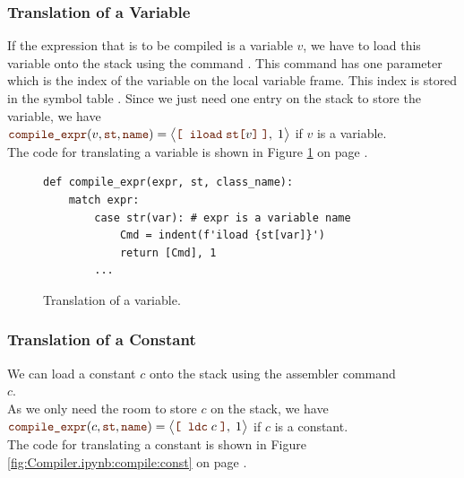 \subsubsection{Translation of a Variable}
If the expression that is to be compiled is a variable $v$, we have to load this variable onto the stack using
the command .  This command has one parameter which is the index of the variable on the local
variable frame.  This index is stored in the symbol table .  Since we just need one entry on the
stack to store the variable, we have
\\[0.2cm]
\hspace*{1.3cm}
$\mytt{compile\_expr}(v, \mytt{st}, \mytt{name}) = 
 \bigl\langle\mytt{[}\;\; \mytt{iload}\; \mytt{st[}v\mytt{]}\; \mytt{]}, \; 1\bigr\rangle$ \quad
 if $v$ is a variable.
\\[0.2cm]
The code for translating a variable is shown in Figure \ref{fig:Compiler.ipynb:compile:var} on page
\pageref{fig:Compiler.ipynb:compile:var}.

\begin{figure}[!ht]
\centering
\begin{verbatim}
def compile_expr(expr, st, class_name):
    match expr:
        case str(var): # expr is a variable name
            Cmd = indent(f'iload {st[var]}')
            return [Cmd], 1
        ...
\end{verbatim}
\vspace*{-0.3cm}
\caption{Translation of a variable.}
\label{fig:Compiler.ipynb:compile:var}
\end{figure}

\subsubsection{Translation of a Constant}
We can load a constant $c$ onto the stack using the assembler command 
\\[0.2cm]
\hspace*{1.3cm}
 $c$.
\\[0.2cm]
As we only need the room to store $c$ on the stack, we have
\\[0.2cm]
\hspace*{1.3cm}
$\mytt{compile\_expr}(c, \mytt{st}, \mytt{name}) = 
 \bigl\langle\mytt{[}\;\; \mytt{ldc}\; c \;\mytt{]}, \; 1\bigr\rangle$ \quad
 if $c$ is a constant.
\\[0.2cm]
The code for translating a constant is shown in Figure \ref{fig:Compiler.ipynb:compile:const} on page
\pageref{fig:Compiler.ipynb:compile:const}.

